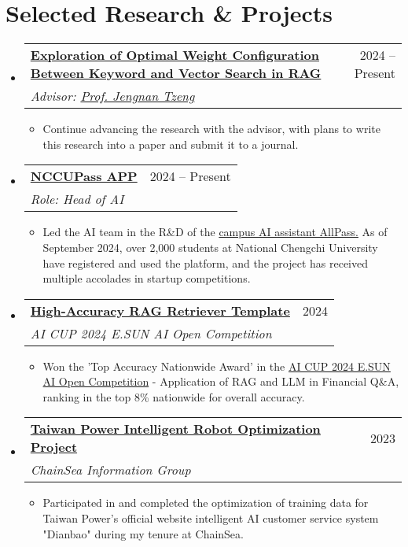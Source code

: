 \documentclass[letterpaper,10pt]{article}
\makeatletter
\newcommand{\resumeItem}[1]{
  \item\small{
    {#1 \vspace{-2pt}}
  }
}
\newcommand{\resumeSubheading}[4]{
  \vspace{-2pt}\item
    \begin{tabular*}{0.97\textwidth}[t]{l@{\extracolsep{\fill}}r}
      \textbf{#1} & #2 \\
      \textit{\small#3} & \textit{\small #4} \\
    \end{tabular*}\vspace{-7pt}
}
\newcommand{\resumeSubHeadingListStart}{\begin{itemize}[leftmargin=0.15in, label={}]}
\newcommand{\resumeSubHeadingListEnd}{\end{itemize}}
\newcommand{\resumeItemListStart}{\begin{itemize}}
\newcommand{\resumeItemListEnd}{\end{itemize}\vspace{-5pt}}
\makeatother
\begin{document}
\section{Selected Research \& Projects}
  \resumeSubHeadingListStart
    \resumeSubheading
      {\href{https://github.com/JustinHsu1019/RAG_Search_Weights}{Exploration of Optimal Weight Configuration Between Keyword and Vector Search in RAG}}{2024 -- Present}
      {Advisor: \href{https://math.nccu.edu.tw/PageStaffing/Detail?fid=4666\&id=1118}{Prof. Jengnan Tzeng}}{}
      \resumeItemListStart
        \resumeItem{Continue advancing the research with the advisor, with plans to write this research into a paper and submit it to a journal.}
      \resumeItemListEnd

    \resumeSubheading
      {\href{https://nccupass.com/}{NCCUPass APP}}{2024 -- Present}
      {Role: Head of AI}{}
      \resumeItemListStart
        \resumeItem{Led the AI team in the R\&D of the \href{https://allpass.nccupass.com}{campus AI assistant AllPass.} As of September 2024, over 2,000 students at National Chengchi University have registered and used the platform, and the project has received multiple accolades in startup competitions.}
      \resumeItemListEnd

    \resumeSubheading
      {\href{https://github.com/JustinHsu1019/AICUP2024-RAG-LLM}{High-Accuracy RAG Retriever Template}}{2024}
      {AI CUP 2024 E.SUN AI Open Competition}{}
      \resumeItemListStart
        \resumeItem{Won the 'Top Accuracy Nationwide Award' in the {\href{https://tbrain.trendmicro.com.tw/Competitions/Details/37}{AI CUP 2024 E.SUN AI Open Competition}} - Application of RAG and LLM in Financial Q\&A, ranking in the top 8\% nationwide for overall accuracy.}
      \resumeItemListEnd

    \resumeSubheading
      {\href{https://service.taipower.com.tw:4433/smartrobot}{Taiwan Power Intelligent Robot Optimization Project}}{2023}
      {ChainSea Information Group}{}
      \resumeItemListStart
        \resumeItem{Participated in and completed the optimization of training data for Taiwan Power's official website intelligent AI customer service system "Dianbao" during my tenure at ChainSea.}
      \resumeItemListEnd
  \resumeSubHeadingListEnd
\end{document}
